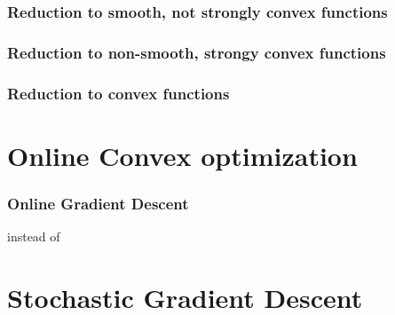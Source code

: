 \documentclass[handout]{beamer}
\begin{document}
\begin{frame}
  \frametitle{Reduction to smooth, not strongly convex functions}
\end{frame}

\begin{frame}
  \frametitle{Reduction to non-smooth, strongy convex functions}
\end{frame}

\begin{frame}
  \frametitle{Reduction to convex functions}
\end{frame}

\section{Online Convex optimization}

\begin{frame}
  \frametitle{Online Gradient Descent}
   instead of 
\end{frame}

\section{Stochastic Gradient Descent}
\end{document}
